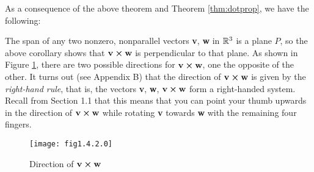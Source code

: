As a consequence of the above theorem and Theorem \ref{thm:dotprop}, we have the following:


The span of any two nonzero, nonparallel vectors \textbf{v}, \textbf{w} in $\mathbb{R}^{3}$ is a plane $P$, so the above
corollary shows that $\textbf{v} \bm{\times} \textbf{w}$ is perpendicular to that plane. As shown in
Figure \ref{fig:crossnormal}, there are two possible directions for $\textbf{v} \bm{\times} \textbf{w}$, one the
opposite of the other.
It turns out (see Appendix B) that the direction of $\textbf{v} \bm{\times} \textbf{w}$
is given by the \emph{right-hand rule}, that is, the vectors \textbf{v}, \textbf{w},
$\textbf{v} \bm{\times} \textbf{w}$ form a right-handed system. Recall from Section 1.1 that this means that
you can point your thumb upwards in the direction of $\textbf{v} \bm{\times} \textbf{w}$
while rotating \textbf{v} towards \textbf{w} with the remaining four fingers.

\begin{figure}[h]
 \begin{center}
  \texttt{[image: fig1.4.2.0]}\vspace{-5mm}
 \end{center}
 \caption[]{\quad Direction of $\textbf{v} \bm{\times} \textbf{w}$}
 \label{fig:crossnormal}
\end{figure}

